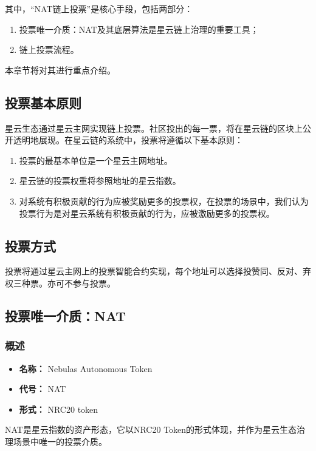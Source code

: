 其中，“NAT链上投票”是核心手段，包括两部分：

\begin{enumerate}
	\item 投票唯一介质：NAT及其底层算法是星云链上治理的重要工具；
	\item 链上投票流程。
\end{enumerate}

本章节将对其进行重点介绍。

\subsection{投票基本原则}

星云生态通过星云主网实现链上投票。社区投出的每一票，将在星云链的区块上公开透明地展现。在星云链的系统中，投票将遵循以下基本原则：

\begin{enumerate}
	\item 投票的最基本单位是一个星云主网地址。
	\item 星云链的投票权重将参照地址的星云指数。
	\item 对系统有积极贡献的行为应被奖励更多的投票权，在投票的场景中，我们认为投票行为是对星云系统有积极贡献的行为，应被激励更多的投票权。
\end{enumerate}

\subsection{投票方式}

投票将通过星云主网上的投票智能合约实现，每个地址可以选择投赞同、反对、弃权三种票。亦可不参与投票。

\subsection{投票唯一介质：NAT}
\label{nat}

\subsubsection{概述}

\begin{itemize}
	\item \textbf{名称：} Nebulas Autonomous Token
	\item \textbf{代号：} NAT
	\item \textbf{形式：} NRC20 token
\end{itemize}

NAT是星云指数的资产形态，它以NRC20 Token的形式体现，并作为星云生态治理场景中唯一的投票介质。

